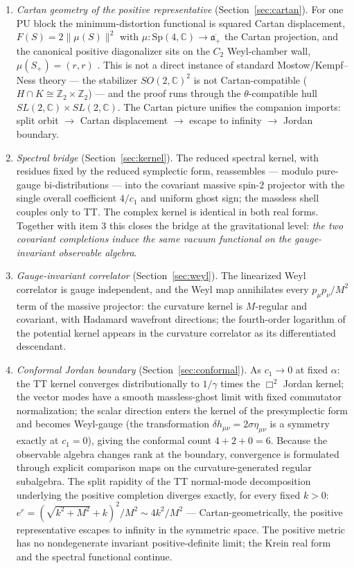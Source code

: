 \documentclass[11pt]{article}
\theoremstyle{definition}
\theoremstyle{remark}
\newcommand{\C}{\mathbb{C}}
\newcommand{\Z}{\mathbb{Z}}
\newcommand{\Sp}{\mathrm{Sp}}
\begin{document}
\begin{enumerate}
\item \emph{Cartan geometry of the positive representative}
(Section~\ref{sec:cartan}).  For one PU block the minimum-distortion
functional is squared Cartan displacement, $F(S)=2\|\mu(S)\|^2$ with
$\mu:\Sp(4,\C)\to\overline{\mathfrak a_+}$ the Cartan projection, and the
canonical positive diagonalizer sits on the $C_2$ Weyl-chamber wall,
$\mu(S_+)=(r,r)$ \cite{companion2}.  This is not a direct instance of
standard Mostow/Kempf--Ness theory --- the stabilizer $SO(2,\C)^2$ is not
Cartan-compatible ($H\cap K\cong\Z_2\times\Z_2$) --- and the proof runs
through the $\theta$-compatible hull $SL(2,\C)\times SL(2,\C)$.  The
Cartan picture unifies the companion imports: split orbit $\to$ Cartan
displacement $\to$ escape to infinity $\to$ Jordan boundary.

\item \emph{Spectral bridge} (Section~\ref{sec:kernel}).  The reduced
spectral kernel, with residues fixed by the reduced symplectic form,
reassembles --- modulo pure-gauge bi-distributions --- into the covariant
massive spin-$2$ projector with the single overall coefficient
$4/c_1$ and uniform ghost sign; the massless shell couples only to TT.
The complex kernel is identical in both real forms.  Together with item 3
this closes the bridge at the gravitational level: \emph{the two covariant
completions induce the same vacuum functional on the gauge-invariant
observable algebra}.

\item \emph{Gauge-invariant correlator} (Section~\ref{sec:weyl}).  The
linearized Weyl correlator is gauge independent, and the Weyl map
annihilates every $p_\mu p_\nu/M^2$ term of the massive projector: the
curvature kernel is $M$-regular and covariant, with Hadamard wavefront
directions; the fourth-order logarithm of the potential kernel appears in
the curvature correlator as its differentiated descendant.

\item \emph{Conformal Jordan boundary} (Section~\ref{sec:conformal}).  As
$c_1\to0$ at fixed $\alpha$: the TT kernel converges distributionally to
$1/\gamma$ times the $\Box^2$ Jordan kernel; the vector modes have a
smooth massless-ghost limit with fixed commutator normalization; the
scalar direction enters the kernel of the presymplectic form and becomes
Weyl-gauge (the transformation $\delta h_{\mu\nu}=2\sigma\eta_{\mu\nu}$
is a symmetry exactly at $c_1=0$), giving the conformal count $4+2+0=6$.
Because the observable algebra changes rank at the boundary, convergence
is formulated through explicit comparison maps on the curvature-generated
regular subalgebra.  The split rapidity of the TT normal-mode
decomposition underlying the positive completion diverges exactly, for
every fixed $k>0$:
$e^{r}=(\sqrt{k^2+M^2}+k)^2/M^2\sim4k^2/M^2$ --- Cartan-geometrically, the
positive representative escapes to infinity in the symmetric space.  The
positive metric has no nondegenerate invariant positive-definite limit;
the Krein real form and the spectral functional continue.
\end{enumerate}
\end{document}
